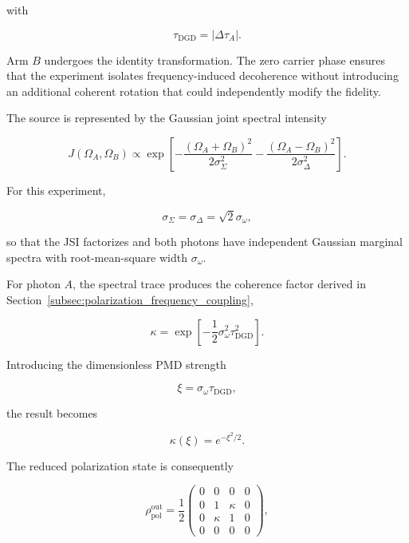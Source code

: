 with

\[
\tau_{\mathrm{DGD}}
=
|\Delta\tau_A|.
\]

Arm \(B\) undergoes the identity transformation. The zero carrier phase ensures
that the experiment isolates frequency-induced decoherence without introducing an
additional coherent rotation that could independently modify the fidelity.

The source is represented by the Gaussian joint spectral intensity

\begin{equation}
J(\Omega_A,\Omega_B)
\propto
\exp
\left[
-
\frac{(\Omega_A+\Omega_B)^2}{2\sigma_{\Sigma}^2}
-
\frac{(\Omega_A-\Omega_B)^2}{2\sigma_{\Delta}^2}
\right].
\label{eq:experiment_1_gaussian_jsi}
\end{equation}

For this experiment,

\begin{equation}
\sigma_{\Sigma}
=
\sigma_{\Delta}
=
\sqrt{2}\sigma_\omega,
\label{eq:experiment_1_uncorrelated_spectrum}
\end{equation}

so that the JSI factorizes and both photons have independent Gaussian marginal
spectra with root-mean-square width \(\sigma_\omega\).

For photon \(A\), the spectral trace produces the coherence factor derived in
Section~\ref{subsec:polarization_frequency_coupling},

\begin{equation}
\kappa
=
\exp
\left[
-\frac{1}{2}
\sigma_\omega^2
\tau_{\mathrm{DGD}}^2
\right].
\label{eq:experiment_1_coherence_factor}
\end{equation}

Introducing the dimensionless PMD strength

\begin{equation}
\xi
=
\sigma_\omega\tau_{\mathrm{DGD}},
\label{eq:experiment_1_dimensionless_pmd_strength}
\end{equation}

the result becomes

\begin{equation}
\boxed{
\kappa(\xi)=e^{-\xi^2/2}
}.
\label{eq:experiment_1_kappa_xi}
\end{equation}

The reduced polarization state is consequently

\begin{equation}
\rho_{\mathrm{pol}}^{\mathrm{out}}
=
\frac{1}{2}
\begin{pmatrix}
0 & 0 & 0 & 0 \\
0 & 1 & \kappa & 0 \\
0 & \kappa & 1 & 0 \\
0 & 0 & 0 & 0
\end{pmatrix},
\label{eq:experiment_1_analytical_density_matrix}
\end{equation}

